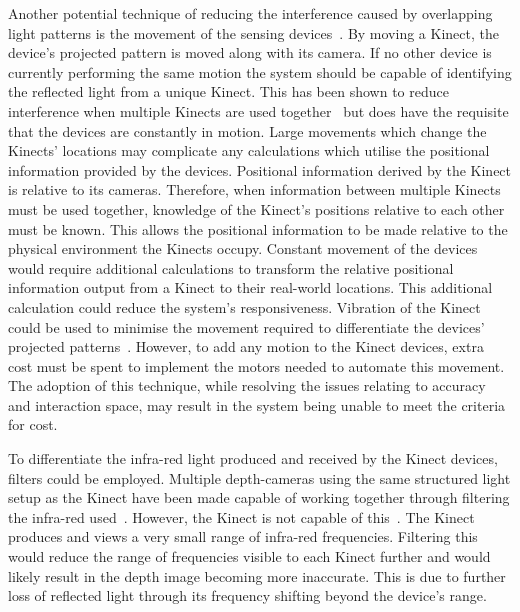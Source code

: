 \documentclass[manuscript, review, screen]{acmart}
\begin{document}
Another potential technique of reducing the interference caused by overlapping light patterns is the movement of the sensing devices~\cite{Maimone2012}.
By moving a Kinect, the device's projected pattern is moved along with its camera.
If no other device is currently performing the same motion the system should be capable of identifying the reflected light from a unique Kinect.
This has been shown to reduce interference when multiple Kinects are used together~\cite{Maimone2012} but does have the requisite that the devices are constantly in motion.
Large movements which change the Kinects' locations may complicate any calculations which utilise the positional information provided by the devices.
Positional information derived by the Kinect is relative to its cameras.
Therefore, when information between multiple Kinects must be used together, knowledge of the Kinect's positions relative to each other must be known.
This allows the positional information to be made relative to the physical environment the Kinects occupy.
Constant movement of the devices would require additional calculations to transform the relative positional information output from a Kinect to their real-world locations.
This additional calculation could reduce the system's responsiveness.
Vibration of the Kinect could be used to minimise the movement required to differentiate the devices' projected patterns~\cite{Kainz2012}.
However, to add any motion to the Kinect devices, extra cost must be spent to implement the motors needed to automate this movement.
The adoption of this technique, while resolving the issues relating to accuracy and interaction space, may result in the system being unable to meet the criteria for cost.

To differentiate the infra-red light produced and received by the Kinect devices, filters could be employed.
Multiple depth-cameras using the same structured light setup as the Kinect have been made capable of working together through filtering the infra-red used~\cite{Kim2008}.
However, the Kinect is not capable of this~\cite{Kainz2012}.
The Kinect produces and views a very small range of infra-red frequencies.
Filtering this would reduce the range of frequencies visible to each Kinect further and would likely result in the depth image becoming more inaccurate.
This is due to further loss of reflected light through its frequency shifting beyond the device's range.
\end{document}

